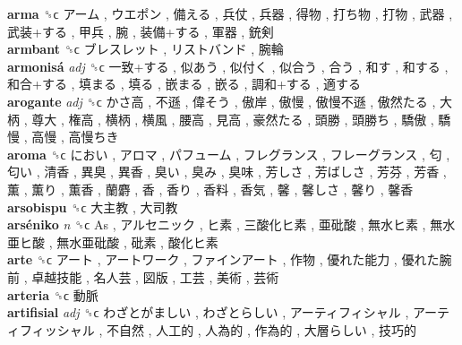 \textbf{arma} ␝ϲ   アーム ,  ウエポン ,  備える ,  兵仗 ,  兵器 ,  得物 ,  打ち物 ,  打物 ,  武器 ,  武装+する ,  甲兵 ,  腕 ,  装備+する ,  軍器 ,  銃剣   \\
\textbf{armbant} ␝ϲ   ブレスレット ,  リストバンド ,  腕輪   \\
\textbf{armonisá} \emph{adj}  ␝ϲ   一致+する ,  似あう ,  似付く ,  似合う ,  合う ,  和す ,  和する ,  和合+する ,  填まる ,  填る ,  嵌まる ,  嵌る ,  調和+する ,  適する   \\
\textbf{arogante} \emph{adj}  ␝ϲ   かさ高 ,  不遜 ,  偉そう ,  傲岸 ,  傲慢 ,  傲慢不遜 ,  傲然たる ,  大柄 ,  尊大 ,  権高 ,  横柄 ,  横風 ,  腰高 ,  見高 ,  豪然たる ,  頭勝 ,  頭勝ち ,  驕傲 ,  驕慢 ,  高慢 ,  高慢ちき   \\
\textbf{aroma} ␝ϲ   におい ,  アロマ ,  パフューム ,  フレグランス ,  フレーグランス ,  匂 ,  匂い ,  清香 ,  異臭 ,  異香 ,  臭い ,  臭み ,  臭味 ,  芳しさ ,  芳ばしさ ,  芳芬 ,  芳香 ,  薫 ,  薫り ,  薫香 ,  蘭麝 ,  香 ,  香り ,  香料 ,  香気 ,  馨 ,  馨しさ ,  馨り ,  馨香   \\
\textbf{arsobispu} ␝ϲ   大主教 ,  大司教   \\
\textbf{arséniko} \emph{n}  ␝ϲ   As ,  アルセニック ,  ヒ素 ,  三酸化ヒ素 ,  亜砒酸 ,  無水ヒ素 ,  無水亜ヒ酸 ,  無水亜砒酸 ,  砒素 ,  酸化ヒ素   \\
\textbf{arte} ␝ϲ   アート ,  アートワーク ,  ファインアート ,  作物 ,  優れた能力 ,  優れた腕前 ,  卓越技能 ,  名人芸 ,  図版 ,  工芸 ,  美術 ,  芸術   \\
\textbf{arteria} ␝ϲ   動脈   \\
\textbf{artifisial} \emph{adj}  ␝ϲ   わざとがましい ,  わざとらしい ,  アーティフィシャル ,  アーティフィッシャル ,  不自然 ,  人工的 ,  人為的 ,  作為的 ,  大層らしい ,  技巧的   \\
